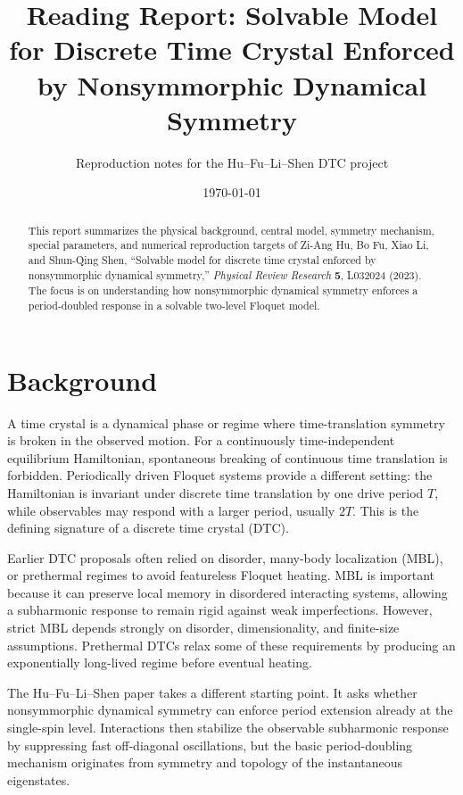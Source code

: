\documentclass[11pt,a4paper]{article}
\title{Reading Report: Solvable Model for Discrete Time Crystal Enforced by Nonsymmorphic Dynamical Symmetry}
\author{Reproduction notes for the Hu--Fu--Li--Shen DTC project}
\date{\today}
\begin{document}
\maketitle

\begin{abstract}
This report summarizes the physical background, central model, symmetry mechanism, special parameters, and numerical reproduction targets of Zi-Ang Hu, Bo Fu, Xiao Li, and Shun-Qing Shen, ``Solvable model for discrete time crystal enforced by nonsymmorphic dynamical symmetry,'' \emph{Physical Review Research} \textbf{5}, L032024 (2023). The focus is on understanding how nonsymmorphic dynamical symmetry enforces a period-doubled response in a solvable two-level Floquet model.
\end{abstract}

\section{Background}

A time crystal is a dynamical phase or regime where time-translation symmetry is broken in the observed motion. For a continuously time-independent equilibrium Hamiltonian, spontaneous breaking of continuous time translation is forbidden. Periodically driven Floquet systems provide a different setting: the Hamiltonian is invariant under discrete time translation by one drive period \(T\), while observables may respond with a larger period, usually \(2T\). This is the defining signature of a discrete time crystal (DTC).

Earlier DTC proposals often relied on disorder, many-body localization (MBL), or prethermal regimes to avoid featureless Floquet heating. MBL is important because it can preserve local memory in disordered interacting systems, allowing a subharmonic response to remain rigid against weak imperfections. However, strict MBL depends strongly on disorder, dimensionality, and finite-size assumptions. Prethermal DTCs relax some of these requirements by producing an exponentially long-lived regime before eventual heating.

The Hu--Fu--Li--Shen paper takes a different starting point. It asks whether nonsymmorphic dynamical symmetry can enforce period extension already at the single-spin level. Interactions then stabilize the observable subharmonic response by suppressing fast off-diagonal oscillations, but the basic period-doubling mechanism originates from symmetry and topology of the instantaneous eigenstates.
\end{document}
